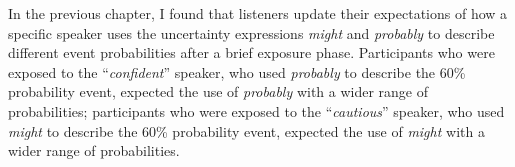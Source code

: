 




In the previous chapter, I found that listeners update their expectations of how a specific speaker
uses the uncertainty expressions \textit{might} and \textit{probably} to describe different event probabilities after a brief
exposure phase. Participants who were exposed to the ``\textit{confident}'' speaker, who used \textit{probably} to describe the 60\% probability event, 
 expected the use of \textit{probably} with a wider range of probabilities; participants who were exposed to the ``\textit{cautious}'' speaker, who
used \textit{might} to describe the 60\% probability event, expected the use of \textit{might} with a wider range of probabilities.


